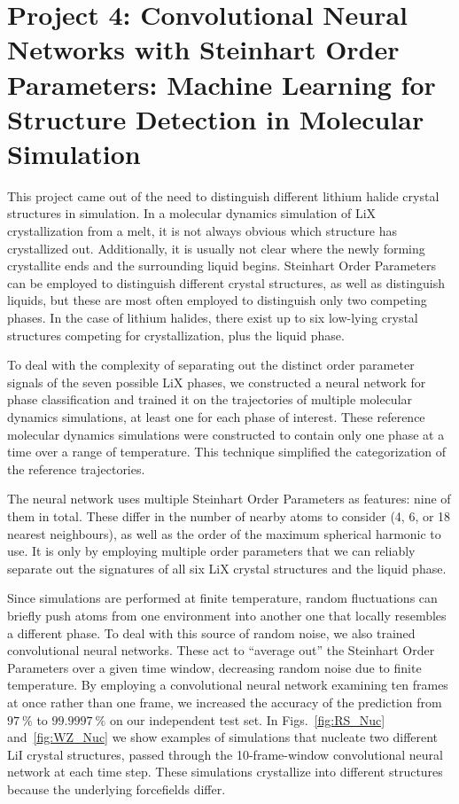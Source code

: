 \documentclass[titlepage,11pt]{article}
\begin{document}
\section{Project 4: Convolutional Neural Networks with Steinhart Order Parameters: Machine Learning for Structure Detection in Molecular Simulation}

This project came out of the need to distinguish different lithium halide crystal structures in simulation. In a molecular dynamics simulation of LiX crystallization from a melt, it is not always obvious which structure has crystallized out. Additionally, it is usually not clear where the newly forming crystallite ends and the surrounding liquid begins. Steinhart Order Parameters~\cite{steinhardt1983bond} can be employed to distinguish different crystal structures, as well as distinguish liquids, but these are most often employed to distinguish only two competing phases. In the case of lithium halides, there exist up to six low-lying crystal structures competing for crystallization, plus the liquid phase.

To deal with the complexity of separating out the distinct order parameter signals of the seven possible LiX phases, we constructed a neural network for phase classification and trained it on the trajectories of multiple molecular dynamics simulations, at least one for each phase of interest. These reference molecular dynamics simulations were constructed to contain only one phase at a time over a range of temperature. This technique simplified the categorization of the reference trajectories.

The neural network uses multiple Steinhart Order Parameters as features: nine of them in total. These differ in the number of nearby atoms to consider (4, 6, or 18 nearest neighbours), as well as the order of the maximum spherical harmonic to use. It is only by employing multiple order parameters that we can reliably separate out the signatures of all six LiX crystal structures and the liquid phase.

Since simulations are performed at finite temperature, random fluctuations can briefly push atoms from one environment into another one that locally resembles a different phase. To deal with this source of random noise, we also trained convolutional neural networks. These act to ``average out'' the Steinhart Order Parameters over a given time window, decreasing random noise due to finite temperature. By employing a convolutional neural network examining ten frames at once rather than one frame, we increased the accuracy of the prediction from $\SI{97}{\percent}$ to $\SI{99.9997}{\percent}$ on our independent test set. In Figs.~\ref{fig:RS_Nuc} and~\ref{fig:WZ_Nuc} we show examples of simulations that nucleate two different LiI crystal structures, passed through the 10-frame-window convolutional neural network at each time step. These simulations crystallize into different structures because the underlying forcefields differ.
\end{document}
